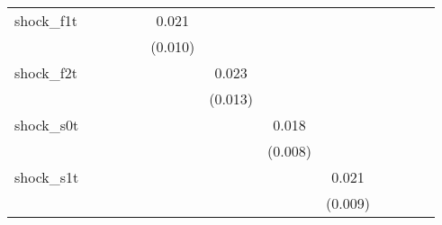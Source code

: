 {\begin{tabular}{l*{12}{c}}
\addlinespace
shock\_f1t   &                     &                     &                     &                     &       0.021\sym{*}  &                     &                     &                     &                     &                     &                     &                     \\
            &                     &                     &                     &                     &     (0.010)         &                     &                     &                     &                     &                     &                     &                     \\
\addlinespace
shock\_f2t   &                     &                     &                     &                     &                     &       0.023\sym{*}  &                     &                     &                     &                     &                     &                     \\
            &                     &                     &                     &                     &                     &     (0.013)         &                     &                     &                     &                     &                     &                     \\
\addlinespace
shock\_s0t   &                     &                     &                     &                     &                     &                     &       0.018\sym{**} &                     &                     &                     &                     &                     \\
            &                     &                     &                     &                     &                     &                     &     (0.008)         &                     &                     &                     &                     &                     \\
\addlinespace
shock\_s1t   &                     &                     &                     &                     &                     &                     &                     &       0.021\sym{**} &                     &                     &                     &                     \\
            &                     &                     &                     &                     &                     &                     &                     &     (0.009)         &                     &                     &                     &                     \\

\end{tabular}}
